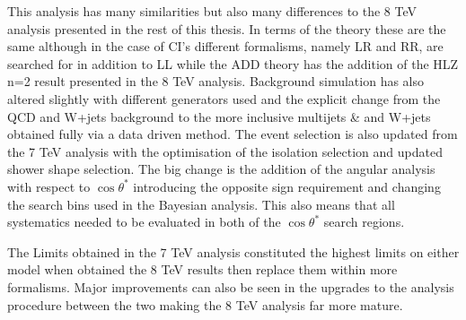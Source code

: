 	This analysis has many similarities but also many differences to the 8 TeV analysis presented in the rest of this thesis. In terms of the theory these are the same although in the case of CI's different formalisms, namely LR and RR, are searched for in addition to LL while the ADD theory has the addition of the HLZ n=2 result presented in the 8 TeV analysis. Background simulation has also altered slightly with different generators used and the explicit change from the QCD and W+jets background to the more inclusive multijets \& and W+jets obtained fully via a data driven method. The event selection is also updated from the 7 TeV analysis with the optimisation of the isolation selection and updated shower shape selection. The big change is the addition of the angular analysis with respect to $\cos\theta^{*}$ introducing the opposite sign requirement and changing the search bins used in the Bayesian analysis. This also means that all systematics needed to be evaluated in both of the $\cos\theta^{*}$ search regions.

	The Limits obtained in the 7 TeV analysis constituted the highest limits on either model when obtained  the 8 TeV results then replace them within more formalisms. Major improvements can also be seen in the upgrades to the analysis procedure between the two making the 8 TeV analysis far more mature. 











































